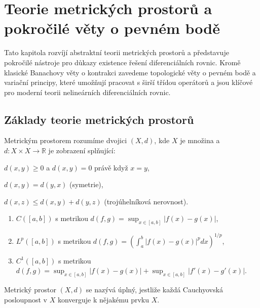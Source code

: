 \section{Teorie metrických prostorů a pokročilé věty o pevném bodě}
\label{chap:metrika-pevny-bod}

Tato kapitola rozvíjí abstraktní teorii metrických prostorů a představuje pokročilé nástroje pro důkazy existence řešení diferenciálních rovnic. 
Kromě klasické Banachovy věty o kontrakci zavedeme topologické věty o pevném bodě a variační principy, které umožňují pracovat s širší třídou operátorů 
a jsou klíčové pro moderní teorii nelineárních diferenciálních rovnic.

\spc

\subsection{Základy teorie metrických prostorů}
\label{sec:zaklady-metrika}

\begin{definition}
\label{def:metricky-prostor}
Metrickým prostorem rozumíme dvojici $(X,d)$, kde $X$ je množina a $d: X \times X \to \mathbb{R}$ je zobrazení splňující:
\begin{romanenum}
\item $d(x,y) \geq 0$ a $d(x,y) = 0$ právě když $x = y$,
\item $d(x,y) = d(y,x)$ (symetrie),
\item $d(x,z) \leq d(x,y) + d(y,z)$ (trojúhelníková nerovnost).
\end{romanenum}
\end{definition}

\begin{example}
\label{ex:metriky-funkce}
\begin{enumerate}
\item $C([a,b])$ s metrikou $d(f,g) = \sup_{x \in [a,b]} |f(x) - g(x)|$,
\item $L^p([a,b])$ s metrikou $d(f,g) = \left(\int_a^b |f(x)-g(x)|^p dx\right)^{1/p}$,
\item $C^1([a,b])$ s metrikou $d(f,g) = \sup_{x \in [a,b]} |f(x)-g(x)| + \sup_{x \in [a,b]} |f'(x)-g'(x)|$.
\end{enumerate}
\end{example}

\begin{definition}
\label{def:uplny-prostor}
Metrický prostor $(X,d)$ se nazývá úplný, jestliže každá Cauchyovská posloupnost v $X$ konverguje k nějakému prvku $X$.
\end{definition}

